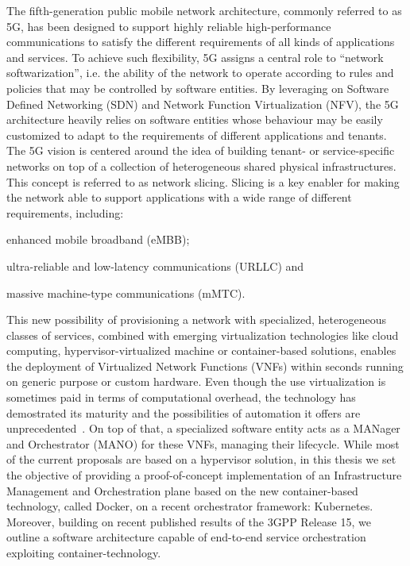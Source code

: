 The fifth-generation public mobile network architecture, commonly referred to as
5G, has been designed to support highly reliable high-performance communications
to satisfy the different requirements of all kinds of applications and services.
To achieve such flexibility, 5G assigns a central role to “network
softwarization”, i.e. the ability of the network to operate according to rules
and policies that may be controlled by software entities. By leveraging on
Software Defined Networking (SDN) and Network Function Virtualization (NFV), the
5G architecture heavily relies on software entities whose behaviour may be
easily customized to adapt to the requirements of different applications and
tenants. The 5G vision is centered around the idea of building tenant- or
service-specific networks on top of a collection of heterogeneous shared
physical infrastructures. This concept is referred to as network slicing.
Slicing is a key enabler for making the network able to support applications
with a wide range of different requirements, including:
\begin{enumerate*}[label=(\roman*)]
\item enhanced mobile broadband (eMBB);
\item ultra-reliable and low-latency communications (URLLC) and
\item massive machine-type communications (mMTC).
\end{enumerate*}

This new possibility of provisioning a network with specialized, heterogeneous
classes of services, combined with emerging virtualization technologies like
cloud computing, hypervisor-virtualized machine or container-based solutions,
enables the deployment of Virtualized Network Functions (VNFs) within seconds
running on generic purpose or custom hardware. Even though the use
virtualization is sometimes paid in terms of computational overhead, the
technology has demostrated its maturity and the possibilities of automation it
offers are unprecedented~\cite{nguyen2017sdn}. On top of that, a specialized
software entity acts as a MANager and Orchestrator (MANO) for these VNFs,
managing their lifecycle. While most of the current proposals are based on a
hypervisor solution, in this thesis we set the objective of providing a
proof-of-concept implementation of an Infrastructure Management and
Orchestration plane based on the new container-based technology, called Docker,
on a recent orchestrator framework: Kubernetes. Moreover, building on recent
published results of the 3GPP Release 15, we outline a software architecture
capable of end-to-end service orchestration exploiting container-technology.
 
